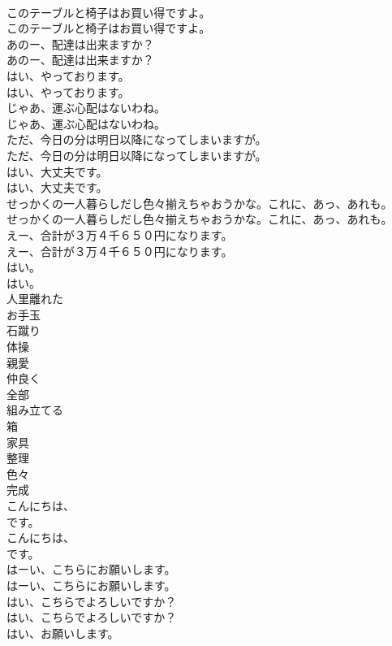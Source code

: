 \documentclass[8pt]{extreport}
\begin{document}
\begin{CJK}{UTF8}{min}
\\	このテーブルと椅子はお買い得ですよ。	
\\	このテーブルと椅子はお買い得ですよ。 
\\	あのー、配達は出来ますか？	
\\	あのー、配達は出来ますか？ 
\\	はい、やっております。	
\\	はい、やっております。 
\\	じゃあ、運ぶ心配はないわね。	
\\	じゃあ、運ぶ心配はないわね。 
\\	ただ、今日の分は明日以降になってしまいますが。	
\\	ただ、今日の分は明日以降になってしまいますが。 
\\	はい、大丈夫です。	
\\	はい、大丈夫です。 
\\	せっかくの一人暮らしだし色々揃えちゃおうかな。これに、あっ、あれも。	
\\	せっかくの一人暮らしだし色々揃えちゃおうかな。これに、あっ、あれも。 
\\	えー、合計が３万４千６５０円になります。	
\\	えー、合計が３万４千６５０円になります。 
\\	はい。	
\\	はい。 
\\	人里離れた
\\	お手玉
\\	石蹴り
\\	体操
\\	親愛
\\	仲良く
\\	全部
\\	組み立てる
\\	箱
\\	家具
\\	整理
\\	色々
\\	完成
\\	こんにちは、
\\	です。	
\\	こんにちは、
\\	です。 
\\	はーい、こちらにお願いします。	
\\	はーい、こちらにお願いします。 
\\	はい、こちらでよろしいですか？	
\\	はい、こちらでよろしいですか？ 
\\	はい、お願いします。	

\end{CJK}
\end{document}

